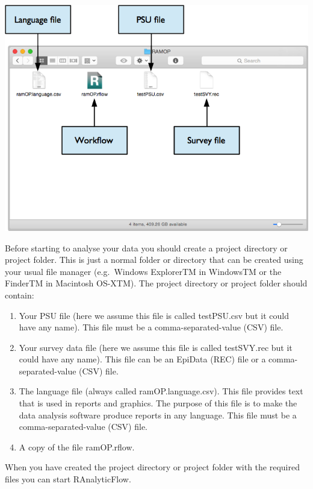 \documentclass[12pt,a4paper]{book}
\theoremstyle{definition}
\theoremstyle{definition}
\theoremstyle{definition}
\theoremstyle{remark}
\begin{document}
\begin{center}\includegraphics[width=9.76in]{figures/dirStructureRAF} \end{center}

Before starting to analyse your data you should create a project
directory or project folder. This is just a normal folder or directory
that can be created using your usual file manager (e.g.~Windows
ExplorerTM in WindowsTM or the FinderTM in Macintosh OS-XTM). The
project directory or project folder should contain:

\begin{enumerate}
\def\labelenumi{\arabic{enumi}.}
\item
  Your PSU file (here we assume this file is called testPSU.csv but it
  could have any name). This file must be a comma-separated-value (CSV)
  file.
\item
  Your survey data file (here we assume this file is called testSVY.rec
  but it could have any name). This file can be an EpiData (REC) file or
  a comma-separated-value (CSV) file.
\item
  The language file (always called ramOP.language.csv). This file
  provides text that is used in reports and graphics. The purpose of
  this file is to make the data analysis software produce reports in any
  language. This file must be a comma-separated-value (CSV) file.
\item
  A copy of the file ramOP.rflow.
\end{enumerate}

When you have created the project directory or project folder with the
required files you can start RAnalyticFlow.
\end{document}

